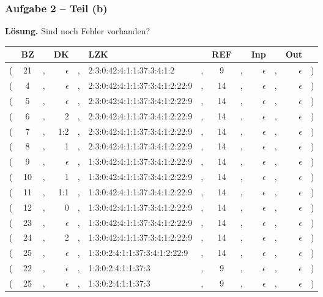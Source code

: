 \documentclass{beamer}
\newcommand*\head{\rowfont{\bfseries}}
\begin{document}
\begin{frame} \frametitle{Aufgabe 2 -- Teil (b)}
	\footnotesize
	\textbf{Lösung.} \hfill {\tiny \color{cdgray!50} Sind noch Fehler vorhanden?}
	
	\tiny
	\begin{center}
		\begin{tabu}{rccrclcccrcrl}
			\head & BZ && DK && LZK && REF && Inp && Out & \\ \hline 
			( & 21 &,& $\epsilon$ &,& 2:3:0:42:4:1:1:37:3:4:1:2      &,&  9 &,& $\epsilon$ &,& $\epsilon$ & ) \\
			( &  4 &,& $\epsilon$ &,& 2:3:0:42:4:1:1:37:3:4:1:2:22:9 &,& 14 &,& $\epsilon$ &,& $\epsilon$ & ) \\
			( &  5 &,& $\epsilon$ &,& 2:3:0:42:4:1:1:37:3:4:1:2:22:9 &,& 14 &,& $\epsilon$ &,& $\epsilon$ & ) \\
			( &  6 &,&          2 &,& 2:3:0:42:4:1:1:37:3:4:1:2:22:9 &,& 14 &,& $\epsilon$ &,& $\epsilon$ & ) \\
			( &  7 &,&        1:2 &,& 2:3:0:42:4:1:1:37:3:4:1:2:22:9 &,& 14 &,& $\epsilon$ &,& $\epsilon$ & ) \\
			( &  8 &,&          1 &,& 2:3:0:42:4:1:1:37:3:4:1:2:22:9 &,& 14 &,& $\epsilon$ &,& $\epsilon$ & ) \\
			( &  9 &,& $\epsilon$ &,& 1:3:0:42:4:1:1:37:3:4:1:2:22:9 &,& 14 &,& $\epsilon$ &,& $\epsilon$ & ) \\
			( & 10 &,&          1 &,& 1:3:0:42:4:1:1:37:3:4:1:2:22:9 &,& 14 &,& $\epsilon$ &,& $\epsilon$ & ) \\
			( & 11 &,&        1:1 &,& 1:3:0:42:4:1:1:37:3:4:1:2:22:9 &,& 14 &,& $\epsilon$ &,& $\epsilon$ & ) \\
			( & 12 &,&          0 &,& 1:3:0:42:4:1:1:37:3:4:1:2:22:9 &,& 14 &,& $\epsilon$ &,& $\epsilon$ & ) \\
			( & 23 &,& $\epsilon$ &,& 1:3:0:42:4:1:1:37:3:4:1:2:22:9 &,& 14 &,& $\epsilon$ &,& $\epsilon$ & ) \\
			( & 24 &,&          2 &,& 1:3:0:42:4:1:1:37:3:4:1:2:22:9 &,& 14 &,& $\epsilon$ &,& $\epsilon$ & ) \\
			( & 25 &,& $\epsilon$ &,& 1:3:0:\phantom{4}2:4:1:1:37:3:4:1:2:22:9 &,& 14 &,& $\epsilon$ &,& $\epsilon$ & ) \\
			( & 22 &,& $\epsilon$ &,& 1:3:0:\phantom{4}2:4:1:1:37:3            &,&  9 &,& $\epsilon$ &,& $\epsilon$ & ) \\
			( & 25 &,& $\epsilon$ &,& 1:3:0:\phantom{4}2:4:1:1:37:3            &,&  9 &,& $\epsilon$ &,& $\epsilon$ & ) \\

\end{tabu}
\end{center}
\end{frame}
\end{document}
